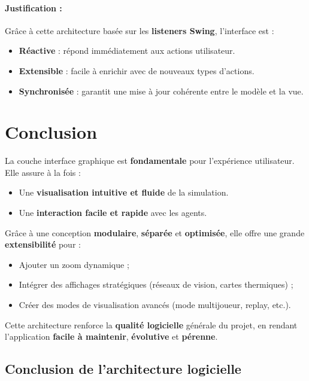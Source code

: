 \paragraph{Justification :}
Grâce à cette architecture basée sur les \textbf{listeners Swing}, l’interface est :
\begin{itemize}
    \item \textbf{Réactive} : répond immédiatement aux actions utilisateur.
    \item \textbf{Extensible} : facile à enrichir avec de nouveaux types d’actions.
    \item \textbf{Synchronisée} : garantit une mise à jour cohérente entre le modèle et la vue.
\end{itemize}

\bigskip

\section*{Conclusion}

La couche interface graphique est \textbf{fondamentale} pour l’expérience utilisateur.  
Elle assure à la fois :
\begin{itemize}
    \item Une \textbf{visualisation intuitive et fluide} de la simulation.
    \item Une \textbf{interaction facile et rapide} avec les agents.
\end{itemize}

Grâce à une conception \textbf{modulaire}, \textbf{séparée} et \textbf{optimisée}, elle offre une grande \textbf{extensibilité} pour :
\begin{itemize}
    \item Ajouter un zoom dynamique ;
    \item Intégrer des affichages stratégiques (réseaux de vision, cartes thermiques) ;
    \item Créer des modes de visualisation avancés (mode multijoueur, replay, etc.).
\end{itemize}

Cette architecture renforce la \textbf{qualité logicielle} générale du projet, en rendant l'application \textbf{facile à maintenir}, \textbf{évolutive} et \textbf{pérenne}.

\subsection*{Conclusion de l’architecture logicielle}

